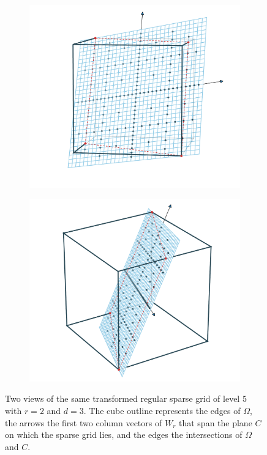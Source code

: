 \documentclass[
  a4paper,  %
  twoside,  %
  bibliography=totoc,
  headsepline,
  cleardoublepage=empty,
  parskip=half,
  draft=false
]{scrbook}
\begin{document}
\newpage
\begin{mdframed}[style=style]
\vspace{2.5mm}
\begin{figure}[H]
\begin{subfigure}{.5\textwidth}
  \centering
  \includegraphics[width=\linewidth]{graphics/surrogate_vis_2}
\end{subfigure}%
\begin{subfigure}{.5\textwidth}
  \centering
  \includegraphics[width=\linewidth]{graphics/surrogate_vis_1}
\end{subfigure}
\vspace{2.5mm}
\delimit
\caption{Two views of the same transformed regular sparse grid of level $5$ with $r=2$ and $d=3$.
The \darkblue cube outline represents the edges of $\Omega$, the arrows the first two column vectors of $W_r$ that span the plane $C$ on which the sparse grid lies, and the \red edges the intersections of $\Omega$ and $C$.}
\label{fig:trans_vis}
\end{figure}
\end{mdframed}
\end{document}
